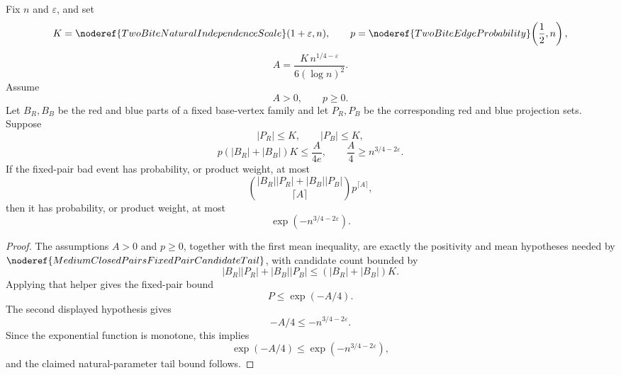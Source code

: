 \begin{lemma}
Fix \(n\) and \(\varepsilon\), and set
\[
K=\noderef{TwoBiteNaturalIndependenceScale}(1+\varepsilon,n),
\qquad
p=\noderef{TwoBiteEdgeProbability}\!\left(\frac12,n\right),
\]
\[
A=\frac{K\,n^{1/4-\varepsilon}}{6(\log n)^2}.
\]
Assume
\[
A>0,\qquad p\ge0.
\]
Let \(B_R,B_B\) be the red and blue parts of a fixed base-vertex family and
let \(P_R,P_B\) be the corresponding red and blue projection sets.  Suppose
\[
|P_R|\le K,\qquad |P_B|\le K,
\]
\[
p(|B_R|+|B_B|)K\le \frac{A}{4e},
\qquad
\frac{A}{4}\ge n^{3/4-2\varepsilon}.
\]
If the fixed-pair bad event has probability, or product weight, at most
\[
\binom{|B_R||P_R|+|B_B||P_B|}{\lceil A\rceil}
  p^{\lceil A\rceil},
\]
then it has probability, or product weight, at most
\[
\exp\!\left(-n^{3/4-2\varepsilon}\right).
\]
\end{lemma}
\begin{proof}
The assumptions \(A>0\) and \(p\ge0\), together with the first mean
inequality, are exactly the positivity and mean hypotheses needed by
\(\noderef{MediumClosedPairsFixedPairCandidateTail}\), with candidate count
bounded by
\[
|B_R||P_R|+|B_B||P_B|\le (|B_R|+|B_B|)K.
\]
Applying that helper gives the fixed-pair bound
\[
P\le \exp(-A/4).
\]
The second displayed hypothesis gives
\[
-A/4\le -n^{3/4-2\varepsilon}.
\]
Since the exponential function is monotone, this implies
\[
\exp(-A/4)\le \exp(-n^{3/4-2\varepsilon}),
\]
and the claimed natural-parameter tail bound follows.
\end{proof}
